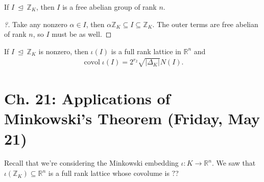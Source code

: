 \begin{lemma}[?]

If \(I{~\trianglelefteq~}{\mathbb{Z}}_K\), then \(I\) is a free abelian
group of rank \(n\).

\end{lemma}

\begin{proof}[?]

Take any nonzero \(\alpha\in I\), then
\(\alpha {\mathbb{Z}}_K \subseteq I \subseteq {\mathbb{Z}}_K\). The
outer terms are free abelian of rank \(n\), so \(I\) must be as well.

\end{proof}

\begin{proposition}[?]

If \(I{~\trianglelefteq~}{\mathbb{Z}}_K\) is nonzero, then \(\iota(I)\)
is a full rank lattice in \({\mathbb{R}}^n\) and
\begin{align*}
\operatorname{covol}\iota(I) = 2^{r_2} \sqrt{{\left\lvert {{\Delta}_K} \right\rvert}} N(I)
.\end{align*}

\end{proposition}

\hypertarget{ch.-21-applications-of-minkowskis-theorem-friday-may-21}{%
\section{Ch. 21: Applications of Minkowski's Theorem (Friday, May
21)}\label{ch.-21-applications-of-minkowskis-theorem-friday-may-21}}

\begin{remark}

Recall that we're considering the Minkowski embedding
\(\iota: K\to{\mathbb{R}}^n\). We saw that
\(\iota({\mathbb{Z}}_K)\subseteq {\mathbb{R}}^n\) is a full rank lattice
whose covolume is \(?\)?

\end{remark}

\cleardoublepage

\renewcommand{\listtheoremname}{}
\listoftheorems[ignoreall,show={definition}, numwidth=3.5em]
\cleardoublepage

\renewcommand{\listtheoremname}{}
\listoftheorems[ignoreall,show={theorem,proposition}, numwidth=3.5em]
\cleardoublepage

\renewcommand{\listtheoremname}{}
\listoftheorems[ignoreall,show={exercise}, numwidth=3.5em]
\cleardoublepage

\listoffigures
\cleardoublepage


\printbibliography[title=Bibliography]



